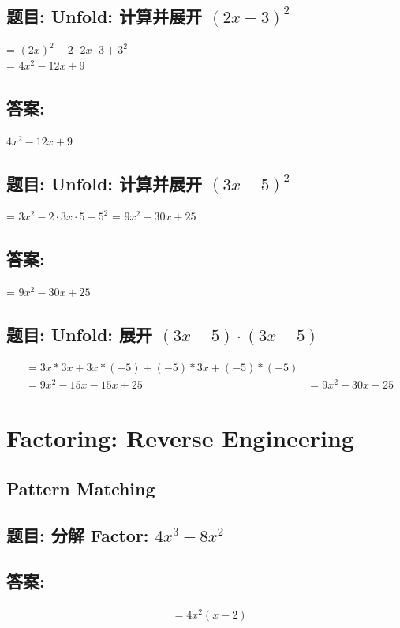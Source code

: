 \documentclass[12pt]{article}
\begin{document}
\subsection*{题目: Unfold:  计算并展开 $(2x-3)^{2}$}
= $(2x)^{2} - 2\cdot2x\cdot3  + 3^{2}$  \\
= $4x^{2} - 12x  + 9$

\subsection*{答案:}
$4x^{2} - 12x  + 9$


\subsection*{题目: Unfold:  计算并展开 $(3x-5)^{2}$}
= $3x^{2} - 2\cdot3x\cdot5 - 5^{2}$
= $9x^{2} - 30x + 25$
\subsection*{答案:}
= $9x^{2} - 30x + 25$

\subsection*{题目: Unfold:  展开 $(3x-5)\cdot(3x-5)$}
\begin{align*}
  &= 3x * 3x  + 3x * (-5)  + (-5) * 3x + (-5) * (-5) \\
  &= 9x^{2} - 15x - 15x  +25 
  &= 9x^{2} - 30x + 25
\end{align*}

\section{Factoring: Reverse Engineering}

\subsection*{Pattern Matching}
\subsection*{题目: 分解 Factor: $4x^{3} - 8x^{2}$}
\subsection*{答案:}
\begin{align*}
  &= 4x^{2}(x - 2) \\
\end{align*}
\end{document}
